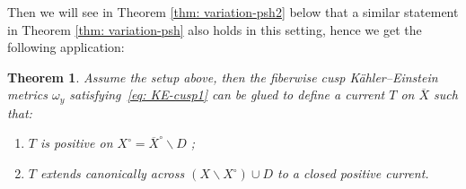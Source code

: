 \documentclass[a4paper, 11pt]{amsart}
\theoremstyle{plain}
\newtheorem{theorem}{Theorem}[section]
\numberwithin{equation}{section} %
\numberwithin{figure}{section} %
\theoremstyle{plain}
\theoremstyle{plain}
\theoremstyle{plain}
\theoremstyle{plain}
\theoremstyle{remark}
\theoremstyle{definition}
\theoremstyle{definition}
\begin{document}
Then we will see in  Theorem \ref{thm: variation-psh2} below that a  similar statement in  Theorem \ref{thm: variation-psh} also holds in this setting, hence we get the following application:
\begin{theorem}  Assume the setup above, then the fiberwise cusp K\"ahler--Einstein metrics $\omega_y$ satisfying~\eqref{eq: KE-cusp1} can be glued to define a current $T$ on  $\overline{X}$ such that: 
    \begin{enumerate}[label=(\roman*)]
        \item $T$ is positive on $X^\circ= \overline{X}^\circ\backslash D$ ;
        \item $T$ extends canonically across $(X\backslash X^\circ)\cup D$ to a closed positive current.
    \end{enumerate}
\end{theorem}
\end{document}
